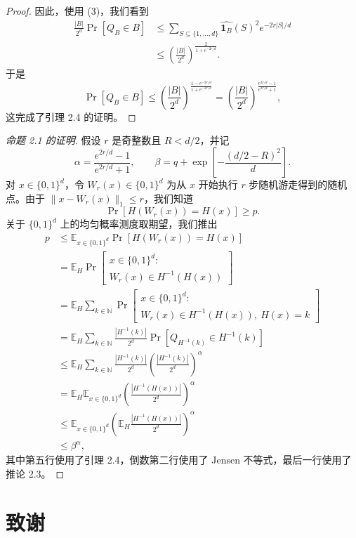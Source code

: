 \documentclass[10pt,twocolumn]{ctexart}
\begin{document}
\begin{proof}
因此，使用 (3)，我们看到
\[
\begin{aligned}
\frac{|B|}{2^d}\Pr[Q_B\in B]
&\le
\sum_{S\subseteq\{1,\ldots,d\}}
\widehat{\mathbf{1}_B}(S)^2e^{-2r|S|/d}\\
&\le
\left(\frac{|B|}{2^d}\right)^{
\frac{2}{1+e^{-2r/d}}
}.
\end{aligned}
\]
于是
\[
\Pr[Q_B\in B]
\le
\left(\frac{|B|}{2^d}\right)^{
\frac{1-e^{-2r/d}}{1+e^{-2r/d}}
}
=
\left(\frac{|B|}{2^d}\right)^{
\frac{e^{2r/d}-1}{e^{2r/d}+1}
},
\]
这完成了引理 2.4 的证明。
\end{proof}

\begin{proof}[命题 2.1 的证明]
假设 $r$ 是奇整数且 $R<d/2$，并记
\[
\alpha=\frac{e^{2r/d}-1}{e^{2r/d}+1},
\qquad
\beta=q+\exp\left[-\frac{(d/2-R)^2}{d}\right].
\]
对 $x\in\{0,1\}^d$，令 $W_r(x)\in\{0,1\}^d$ 为从 $x$ 开始执行 $r$ 步随机游走得到的随机点。由于 $\|x-W_r(x)\|_1\le r$，我们知道
\[
\Pr[H(W_r(x))=H(x)]\ge p.
\]
关于 $\{0,1\}^d$ 上的均匀概率测度取期望，我们推出
\[
\begin{aligned}
p
&\le
\mathbb{E}_{x\in\{0,1\}^d}
\Pr[H(W_r(x))=H(x)]\\
&=
\mathbb{E}_{H}\Pr\left[
\begin{array}{c}
x\in\{0,1\}^d:\\
W_r(x)\in H^{-1}(H(x))
\end{array}
\right]\\
&=
\mathbb{E}_{H}\sum_{k\in\mathbb{N}}
\Pr\left[
\begin{array}{c}
x\in\{0,1\}^d:\\
W_r(x)\in H^{-1}(H(x)),\ H(x)=k
\end{array}
\right]\\
&=
\mathbb{E}_{H}\sum_{k\in\mathbb{N}}
\frac{|H^{-1}(k)|}{2^d}
\Pr\left[Q_{H^{-1}(k)}\in H^{-1}(k)\right]\\
&\le
\mathbb{E}_{H}\sum_{k\in\mathbb{N}}
\frac{|H^{-1}(k)|}{2^d}
\left(\frac{|H^{-1}(k)|}{2^d}\right)^\alpha\\
&=
\mathbb{E}_{H}\mathbb{E}_{x\in\{0,1\}^d}
\left(\frac{|H^{-1}(H(x))|}{2^d}\right)^\alpha\\
&\le
\mathbb{E}_{x\in\{0,1\}^d}
\left(\mathbb{E}_{H}
\frac{|H^{-1}(H(x))|}{2^d}
\right)^\alpha\\
&\le
\beta^\alpha,
\end{aligned}
\]
其中第五行使用了引理 2.4，倒数第二行使用了 Jensen 不等式，最后一行使用了推论 2.3。
\end{proof}

\section{致谢}
\end{document}
